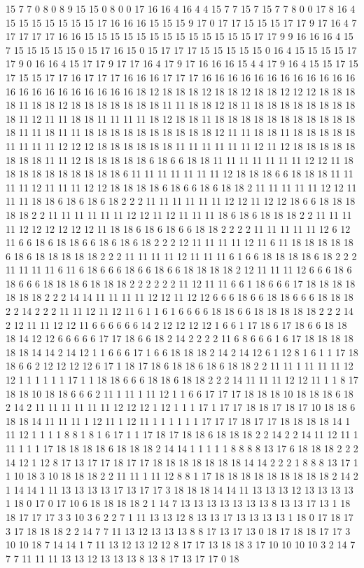 15 7 7 0 8 0 8 9 15 15 0 8 0 0 17 16 16 4 16 4 4 15 7 7 15 7 15 7 7 8 0 0 17 8 16 4 15 15 15 15 15 15 15 17 16 16 16 15 15 15 9 17 0 17 17 15 15 15 17 17 9 17 16 4 7 17 17 17 17 16 16 15 15 15 15 15 15 15 15 15 15 15 15 15 17 17 9 9 16 16 16 4 15 7 15 15 15 15 15 0 15 17 16 15 0 15 17 17 17 15 15 15 15 15 0 16 4 15 15 15 15 17 17 9 0 16 16 4 15 17 17 9 17 17 16 4 17 9 17 16 16 16 15 4 4 17 9 16 4 15 15 17 15 17 15 15 17 17 16 17 17 17 16 16 16 17 17 17 16 16 16 16 16 16 16 16 16 16 16 16 16 16 16 16 16 16 16 16 16 16 18 12 18 18 18 12 18 18 12 18 18 12 12 12 18 18 18 18 11 18 18 12 18 18 18 18 18 18 18 11 11 18 18 12 18 11 18 18 18 18 18 18 18 18 18 11 12 11 11 18 18 11 11 11 11 18 12 18 18 11 18 18 18 18 18 18 18 18 18 18 18 18 11 11 18 11 11 18 18 18 18 18 18 18 18 18 18 12 11 11 18 18 11 18 18 18 18 18 11 11 11 11 12 12 12 18 18 18 18 18 18 11 11 11 11 11 11 12 11 12 18 18 18 18 18 18 18 18 11 11 12 18 18 18 18 18 6 18 6 6 18 18 11 11 11 11 11 11 11 12 12 11 18 18 18 18 18 18 18 18 18 18 6 11 11 11 11 11 11 11 12 18 18 18 6 6 18 18 18 11 11 11 11 12 11 11 11 12 12 18 18 18 18 6 18 6 6 18 6 18 18 2 11 11 11 11 11 12 12 11 11 11 18 18 6 18 6 18 6 18 2 2 2 11 11 11 11 11 11 12 12 11 12 12 18 6 6 18 18 18 18 18 2 2 11 11 11 11 11 11 12 12 11 12 11 11 11 18 6 18 6 18 18 18 2 2 11 11 11 11 12 12 12 12 12 12 11 18 18 6 18 6 18 6 6 18 18 2 2 2 2 11 11 11 11 11 12 6 12 11 6 6 18 6 18 18 6 6 18 6 18 6 18 2 2 2 12 11 11 11 11 12 11 6 11 18 18 18 18 18 6 18 6 18 18 18 18 18 2 2 2 11 11 11 11 12 11 11 11 6 1 6 6 18 18 18 18 6 18 2 2 2 11 11 11 11 6 11 6 18 6 6 6 18 6 6 18 6 6 18 18 18 18 2 12 11 11 11 12 6 6 6 18 6 18 6 6 6 18 18 18 6 18 18 18 2 2 2 2 2 2 11 12 11 11 6 6 1 18 6 6 6 17 18 18 18 18 18 18 18 2 2 2 14 14 11 11 11 11 12 12 11 12 12 6 6 6 18 6 6 18 18 6 6 6 18 18 18 2 2 14 2 2 2 11 11 12 11 12 11 6 1 1 6 1 6 6 6 6 18 18 6 6 18 18 18 18 18 2 2 2 14 2 12 11 11 12 12 11 6 6 6 6 6 6 14 2 12 12 12 12 1 6 6 1 17 18 6 17 18 6 6 18 18 18 14 12 12 6 6 6 6 6 17 17 18 6 6 18 2 14 2 2 2 2 11 6 8 6 6 6 1 6 17 18 18 18 18 18 18 14 14 2 14 12 1 1 6 6 6 17 1 6 6 18 18 18 2 14 2 14 12 6 1 12 8 1 6 1 1 17 18 18 6 6 2 12 12 12 12 6 17 1 18 17 18 6 18 18 6 18 6 18 18 2 2 11 11 1 11 11 11 12 12 1 1 1 1 1 1 17 1 1 18 18 6 6 6 18 18 6 18 18 2 2 2 14 11 11 11 12 12 11 1 1 8 17 18 18 10 18 18 6 6 6 2 11 1 11 1 11 12 1 1 6 6 17 17 17 18 18 18 10 18 18 18 6 18 2 14 2 11 11 11 11 11 11 12 12 12 1 12 1 1 1 17 1 17 17 18 18 17 18 17 10 18 18 6 18 18 14 11 11 11 1 12 11 1 12 11 1 1 1 1 1 1 17 17 17 18 17 17 18 18 18 18 14 1 11 12 1 1 1 1 8 8 1 8 1 6 17 1 1 17 18 17 18 18 6 18 18 18 2 2 14 2 2 14 11 12 11 1 11 1 1 1 17 18 18 18 18 6 18 18 18 2 14 14 1 1 1 1 1 8 8 8 8 13 17 6 18 18 18 2 2 2 14 12 1 12 8 17 13 17 17 18 17 17 18 18 18 18 18 18 18 14 14 2 2 2 1 8 8 8 13 17 1 1 10 18 3 10 18 18 18 2 2 11 11 1 11 12 8 8 1 17 18 18 18 18 18 18 18 18 18 2 14 2 1 14 14 1 11 13 13 13 13 17 13 17 17 3 18 18 18 14 14 11 13 13 13 12 13 13 13 13 1 18 0 17 0 17 10 6 18 18 18 18 2 1 14 7 13 13 13 13 13 13 13 8 13 13 17 13 1 18 18 17 17 17 3 3 10 3 6 2 2 7 1 11 13 13 12 8 13 13 17 13 13 13 13 1 18 0 17 18 17 3 17 18 18 18 2 2 14 7 7 11 13 12 13 13 13 8 8 17 13 17 13 0 18 17 18 18 17 17 3 10 10 18 7 14 14 1 7 11 13 12 13 12 12 8 17 17 13 18 18 3 17 10 10 10 10 3 2 14 7 7 7 11 11 11 13 13 12 13 13 13 8 13 8 17 13 17 17 0 18 